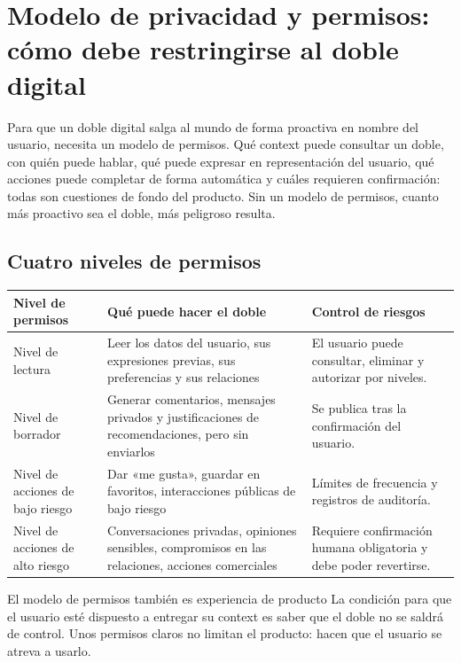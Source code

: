 \section{Modelo de privacidad y permisos: cómo debe restringirse al doble digital}

Para que un doble digital salga al mundo de forma proactiva en nombre del usuario, necesita un modelo de permisos. Qué context puede consultar un doble, con quién puede hablar, qué puede expresar en representación del usuario, qué acciones puede completar de forma automática y cuáles requieren confirmación: todas son cuestiones de fondo del producto. Sin un modelo de permisos, cuanto más proactivo sea el doble, más peligroso resulta.

\subsection{Cuatro niveles de permisos}

\noindent\begin{tabularx}{\textwidth}{p{}p{}X}
\toprule
Nivel de permisos & Qué puede hacer el doble & Control de riesgos \\
\midrule
Nivel de lectura & Leer los datos del usuario, sus expresiones previas, sus preferencias y sus relaciones & El usuario puede consultar, eliminar y autorizar por niveles. \\
Nivel de borrador & Generar comentarios, mensajes privados y justificaciones de recomendaciones, pero sin enviarlos & Se publica tras la confirmación del usuario. \\
Nivel de acciones de bajo riesgo & Dar «me gusta», guardar en favoritos, interacciones públicas de bajo riesgo & Límites de frecuencia y registros de auditoría. \\
Nivel de acciones de alto riesgo & Conversaciones privadas, opiniones sensibles, compromisos en las relaciones, acciones comerciales & Requiere confirmación humana obligatoria y debe poder revertirse. \\
\bottomrule
\end{tabularx}

\begin{knowledgebox}{El modelo de permisos también es experiencia de producto}
La condición para que el usuario esté dispuesto a entregar su context es saber que el doble no se saldrá de control. Unos permisos claros no limitan el producto: hacen que el usuario se atreva a usarlo.
\end{knowledgebox}

